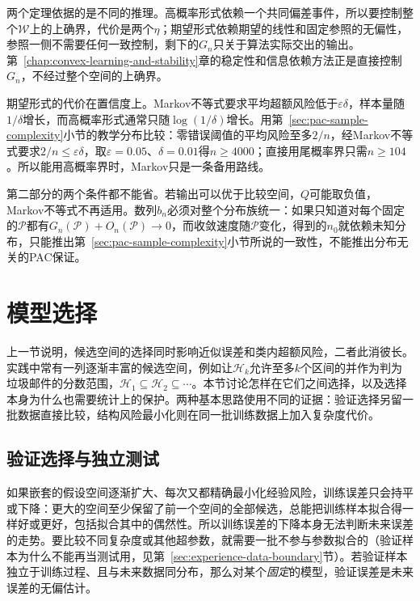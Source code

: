 两个定理依据的是不同的推理。高概率形式依赖一个共同偏差事件，所以要控制整个$\mathcal W$上的上确界，代价是两个$\eta$；期望形式依赖期望的线性和固定参照的无偏性，参照一侧不需要任何一致控制，剩下的$G_n$只关于算法实际交出的输出。第~\ref{chap:convex-learning-and-stability}章的稳定性和信息依赖方法正是直接控制$G_n$，不经过整个空间的上确界。

期望形式的代价在置信度上。Markov不等式要求平均超额风险低于$\varepsilon\delta$，样本量随$1/\delta$增长，而高概率形式通常只随$\log(1/\delta)$增长。用第~\ref{sec:pac-sample-complexity}小节的教学分布比较：零错误阈值的平均风险至多$2/n$，经Markov不等式要求$2/n\leq\varepsilon\delta$，取$\varepsilon=0.05$、$\delta=0.01$得$n\geq4000$；直接用尾概率界只需$n\geq104$。所以能用高概率界时，Markov只是一条备用路线。

第二部分的两个条件都不能省。若输出可以优于比较空间，$Q$可能取负值，Markov不等式不再适用。数列$b_n$必须对整个分布族统一：如果只知道对每个固定的$\mathcal P$都有$G_n(\mathcal P)+O_n(\mathcal P)\to0$，而收敛速度随$\mathcal P$变化，得到的$n_0$就依赖未知分布，只能推出第~\ref{sec:pac-sample-complexity}小节所说的一致性，不能推出分布无关的PAC保证。

\section{模型选择}
\label{sec:model-selection}

上一节说明，候选空间的选择同时影响近似误差和类内超额风险，二者此消彼长。实践中常有一列逐渐丰富的候选空间，例如让$\mathcal H_k$允许至多$k$个区间的并作为判为垃圾邮件的分数范围，$\mathcal H_1\subseteq\mathcal H_2\subseteq\cdots$。本节讨论怎样在它们之间选择，以及选择本身为什么也需要统计上的保护。两种基本思路使用不同的证据：验证选择另留一批数据直接比较，结构风险最小化则在同一批训练数据上加入复杂度代价。

\subsection{验证选择与独立测试}
\label{sec:validation-model-selection}

如果嵌套的假设空间逐渐扩大、每次又都精确最小化经验风险，训练误差只会持平或下降：更大的空间至少保留了前一个空间的全部候选，总能把训练样本拟合得一样好或更好，包括拟合其中的偶然性。所以训练误差的下降本身无法判断未来误差的走势。要比较不同复杂度或其他超参数，就需要一批不参与参数拟合的（验证样本为什么不能再当测试用，见第~\ref{sec:experience-data-boundary}节）。若验证样本独立于训练过程、且与未来数据同分布，那么对某个\emph{固定}的模型，验证误差是未来误差的无偏估计。

